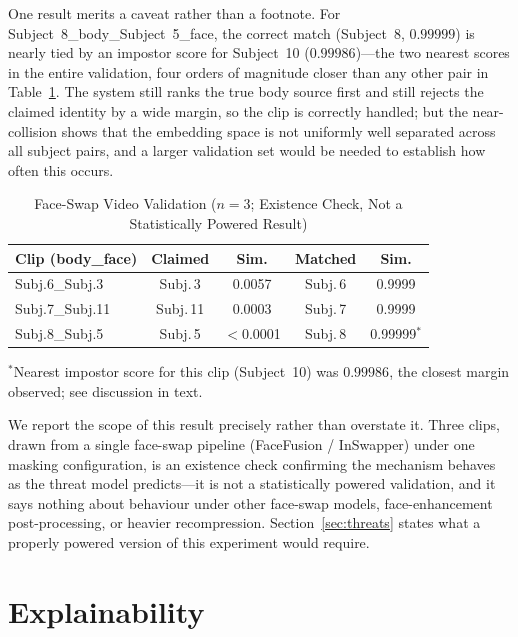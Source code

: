 \documentclass[journal]{IEEEtran}
\newcommand{\tabhead}[1]{\textbf{#1}}
\begin{document}
One result merits a caveat rather than a footnote. For
Subject~8\_body\_Subject~5\_face, the correct match (Subject~8, $0.99999$) is
nearly tied by an impostor score for Subject~10 ($0.99986$)---the two
nearest scores in the entire validation, four orders of magnitude closer than
any other pair in Table~\ref{tab:deepfake-video}. The system still ranks the
true body source first and still rejects the claimed identity by a wide margin,
so the clip is correctly handled; but the near-collision shows that the
embedding space is not uniformly well separated across all subject pairs, and
a larger validation set would be needed to establish how often this occurs.

\begin{table}[!t]
\caption{Face-Swap Video Validation ($n=3$; Existence Check, Not a
Statistically Powered Result)}
\label{tab:deepfake-video}
\centering
\small
\begin{tabular}{@{}lcccc@{}}
\toprule
\tabhead{Clip (body\_face)} & \tabhead{Claimed} & \tabhead{Sim.} &
\tabhead{Matched} & \tabhead{Sim.} \\
\midrule
Subj.6\_Subj.3 & Subj.\,3 & 0.0057 & Subj.\,6 & 0.9999 \\
Subj.7\_Subj.11 & Subj.\,11 & 0.0003 & Subj.\,7 & 0.9999 \\
Subj.8\_Subj.5  & Subj.\,5 & $<$0.0001 & Subj.\,8 & 0.99999$^{\ast}$ \\
\bottomrule
\end{tabular}

\vspace{2pt}
\raggedright\footnotesize
$^{\ast}$Nearest impostor score for this clip (Subject~10) was $0.99986$,
the closest margin observed; see discussion in text.
\end{table}

We report the scope of this result precisely rather than overstate it. Three
clips, drawn from a single face-swap pipeline (FaceFusion / InSwapper) under
one masking configuration, is an existence check confirming the mechanism
behaves as the threat model predicts---it is not a statistically powered
validation, and it says nothing about behaviour under other face-swap models,
face-enhancement post-processing, or heavier recompression.
Section~\ref{sec:threats} states what a properly powered version of this
experiment would require.

\section{Explainability}
\label{sec:explain}
\end{document}
